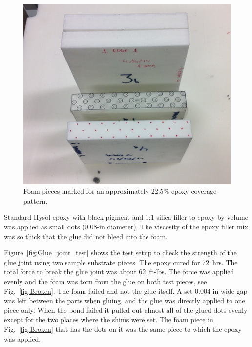 \begin{figure}[ht]
    \centering
    \includegraphics[width=1.0\linewidth]{images/Pattern.png}
    \caption{Foam pieces marked for an approximately 22.5\% epoxy coverage pattern.}
    \label{fig:Pattern}
\end{figure}

Standard Hysol epoxy with black pigment and 1:1 silica filler to epoxy by volume was applied as small dots (0.08-in
diameter). The viscosity of the epoxy filler mix was so thick that the glue did not bleed into the foam. 

Figure~\ref{fig:Glue_joint_test} shows the test setup to check the strength of the glue joint using two sample
substrate pieces. The epoxy cured for 72~hrs. The total force to break the glue joint was about 62~ft-lbs. The
force was applied evenly and the foam was torn from the glue on both test pieces, see Fig.~\ref{fig:Broken}. The
foam failed and not the glue itself. A set 0.004-in wide gap was left between the parts when gluing, and the glue
was directly applied to one piece only. When the bond failed it pulled out almost all of the glued dots evenly except
for the two places where the shims were set. The foam piece in Fig.~\ref{fig:Broken} that has the dots on it was
the same piece to which the epoxy was applied.

